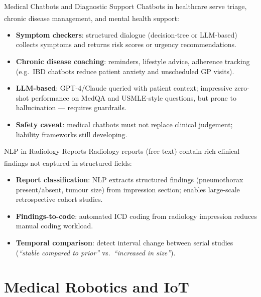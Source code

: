 \begin{v3topic}{Medical Chatbots and Diagnostic Support}
    Chatbots in healthcare serve triage, chronic disease management, and mental health support\textsuperscript{\cite[][]{juhnArtificialIntelligenceNLP2020}}:
    \begin{itemize}
        \item \textbf{Symptom checkers}: structured dialogue (decision-tree or LLM-based) collects symptoms and returns risk scores or urgency recommendations.
        \item \textbf{Chronic disease coaching}: reminders, lifestyle advice, adherence tracking (e.g.\ IBD chatbots reduce patient anxiety and unscheduled GP visits).
        \item \textbf{LLM-based}: GPT-4/Claude queried with patient context; impressive zero-shot performance on MedQA and USMLE-style questions, but prone to hallucination — requires guardrails.
        \item \textbf{Safety caveat}: medical chatbots must not replace clinical judgement; liability frameworks still developing.
    \end{itemize}

\end{v3topic}
\begin{v3topic}{NLP in Radiology Reports}
    Radiology reports (free text) contain rich clinical findings not captured in structured fields\textsuperscript{\cite[][p.~639]{sorinDeepLearningNLP2020}}:
    \begin{itemize}
        \item \textbf{Report classification}: NLP extracts structured findings (pneumothorax present/absent, tumour size) from impression section; enables large-scale retrospective cohort studies.
        \item \textbf{Findings-to-code}: automated ICD coding from radiology impression reduces manual coding workload.
        \item \textbf{Temporal comparison}: detect interval change between serial studies (\textit{``stable compared to prior''} vs.\ \textit{``increased in size''}).
    \end{itemize}
\end{v3topic}

\section{Medical Robotics and IoT}

